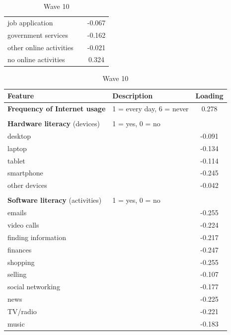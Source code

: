 \begin{table}
\begin{subtable}[t]{0.4\textwidth}
\begin{tabular}{llc}
                job application &  & -0.067 \\
                government services &  & -0.162 \\
                other online activities &  & -0.021 \\
                no online activities &  & 0.324 \\
                \bottomrule
            \end{tabular}
        \end{subtable}
        \hfil
        \begin{subtable}[t]{0.4\textwidth}
            \centering
            \scriptsize
            \caption{Wave 10}
            \label{tab:pc1_loadings_w10_rq2}
            \begin{tabular}{llc}
                \toprule
                Feature & Description & Loading \\
                \midrule
                \textbf{Frequency of Internet usage} & 1 = every day, 6 = never & 0.278 \\
                & & \\
                \textbf{Hardware literacy} (devices) & 1 = yes, 0 = no & \\
                desktop &  & -0.091 \\
                laptop &  & -0.134 \\
                tablet &  & -0.114 \\
                smartphone &  & -0.245 \\
                other devices &  & -0.042 \\
                & & \\
                \textbf{Software literacy} (activities) & 1 = yes, 0 = no & \\
                emails &  & -0.255 \\
                video calls &  & -0.224 \\
                finding information &  & -0.217 \\
                finances &  & -0.247 \\
                shopping &  & -0.255 \\
                selling &  & -0.107 \\
                social networking &  & -0.177 \\
                news &  & -0.225 \\
                TV/radio &  & -0.221 \\
                music &  & -0.183 \\

\end{tabular}
\end{subtable}
\end{table}
